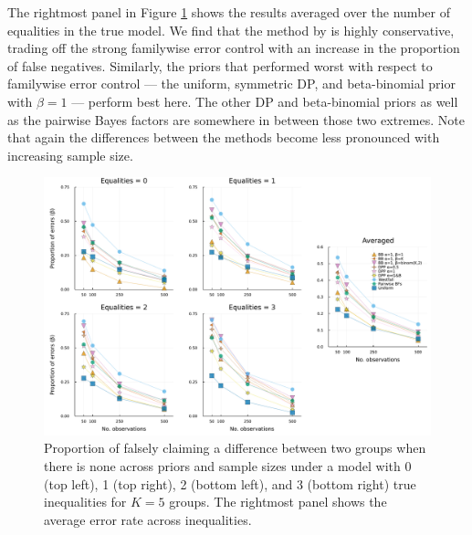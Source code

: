 \documentclass[11pt,a4paper]{article}
\theoremstyle{definition} %
\theoremstyle{case}
\begin{document}
The rightmost panel in Figure \ref{fig:big_simulation-II} shows the results averaged over the number of equalities in the true model. We find that the method by \textcite{westfall1997bayesian} is highly conservative, trading off the strong familywise error control with an increase in the proportion of false negatives. Similarly, the priors that performed worst with respect to familywise error control — the uniform, symmetric DP, and beta-binomial prior with $\beta = 1$ — perform best here. The other DP and beta-binomial priors as well as the pairwise Bayes factors are somewhere in between those two extremes. Note that again the differences between the methods become less pronounced with increasing sample size.


\begin{figure}[!h]
    \centering
    \includegraphics[width=1\textwidth]{figures/subset_k_5_beta.pdf}
    \caption{Proportion of falsely claiming a difference between two groups when there is none across priors and sample sizes under a model with 0 (top left), 1 (top right), 2 (bottom left), and 3 (bottom right) true inequalities for $K = 5$ groups. The rightmost panel shows the average error rate across inequalities.}
    \label{fig:big_simulation-II}
\end{figure}
\end{document}
